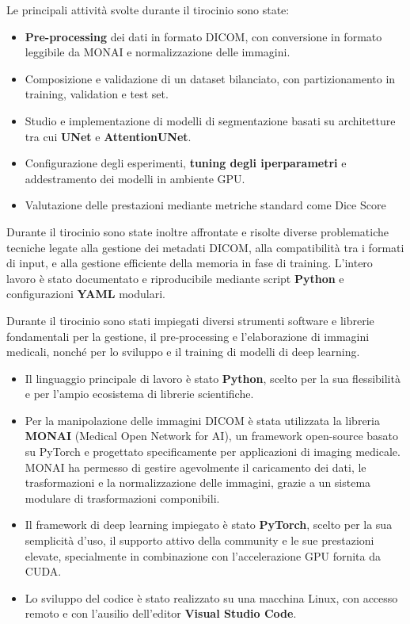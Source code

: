 Le principali attività svolte durante il tirocinio sono state:
\begin{itemize}
    \item \textbf{Pre-processing} dei dati in formato DICOM, con conversione in formato leggibile da MONAI e normalizzazione delle immagini.
    \item Composizione e validazione di un dataset bilanciato, con partizionamento in training, validation e test set.
    \item Studio e implementazione di modelli di segmentazione basati su architetture tra cui \textbf{UNet} e \textbf{AttentionUNet}.
    \item Configurazione degli esperimenti, \textbf{tuning degli iperparametri} e addestramento dei modelli in ambiente GPU.
    \item Valutazione delle prestazioni mediante metriche standard come Dice Score
\end{itemize}

Durante il tirocinio sono state inoltre affrontate e risolte diverse problematiche tecniche legate alla gestione dei metadati DICOM, alla compatibilità tra i formati di input, e alla gestione efficiente della memoria in fase di training. L'intero lavoro è stato documentato e riproducibile mediante script \textbf{Python} e configurazioni \textbf{YAML} modulari.


	
Durante il tirocinio sono stati impiegati diversi strumenti software e librerie  fondamentali per la gestione, il pre-processing e l'elaborazione di immagini medicali, nonché per lo sviluppo e il training di modelli di deep learning.
\begin{itemize}
	\item  Il linguaggio principale di lavoro è stato \textbf{Python}, scelto per la sua flessibilità e per l'ampio ecosistema di librerie scientifiche.
	\item Per la manipolazione delle immagini DICOM è stata utilizzata la libreria \textbf{MONAI} (Medical Open Network for AI), un framework open-source basato su PyTorch e progettato specificamente per applicazioni di imaging medicale. MONAI ha permesso di gestire agevolmente il caricamento dei dati, le trasformazioni e la normalizzazione delle immagini, grazie a un sistema modulare di trasformazioni componibili.
	\item Il framework di deep learning impiegato è stato \textbf{PyTorch}, scelto per la sua semplicità d'uso, il supporto attivo della community e le sue prestazioni elevate, specialmente in combinazione con l'accelerazione GPU fornita da CUDA.
	\item Lo sviluppo del codice è stato realizzato su una macchina Linux, con accesso remoto e con l'ausilio dell'editor \textbf{Visual Studio Code}.
\end{itemize}


